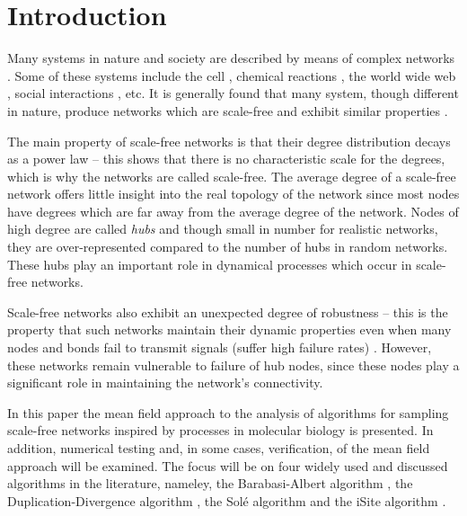 \documentclass[12pt]{iopart}
\begin{document}

\section{Introduction}

Many systems in nature and society are described by means of complex networks  
\cite{BLM06}. Some of these systems include the cell \cite{JTA00}, 
chemical reactions \cite{GA05}, the world wide web \cite{BAJ00}, 
social interactions \cite{BBP04}, etc.  It is generally found that many system,
though different in nature,  produce networks which are scale-free and
exhibit similar properties \cite{AB02,B09}. 

The main property of scale-free networks is that their degree distribution 
decays as a power law \cite{AB02,BA99} -- this shows that there is no
characteristic scale for the degrees, which is why the networks are called scale-free.
The average degree of a scale-free network offers little insight into the 
real topology of the network \cite{B09} since most nodes have degrees which are far 
away from the average degree of the network.  Nodes of high degree are
called \textit{hubs} and though small in number for realistic networks, they are
over-represented compared to the number of hubs in random networks.  These
hubs play an important role in dynamical processes which occur in scale-free networks.

Scale-free networks also exhibit an unexpected degree of robustness --  this is the
property that such networks maintain their dynamic properties even when many 
nodes and bonds fail to transmit signals (suffer high failure rates) \cite{BLM06}.
However, these networks remain vulnerable to failure of hub nodes, since these
nodes play a significant role in maintaining the network's connectivity.

In this paper the mean field approach to the analysis of algorithms for sampling
scale-free networks inspired by processes in molecular biology is presented.
In addition, numerical testing and, in some cases, verification, of the mean field
approach will be examined.  The focus will be on four widely used and discussed
algorithms in the literature, nameley, the Barabasi-Albert algorithm \cite{BA99,BAJ99}, 
the Duplication-Divergence algorithm \cite{TR04,VF02}, 
the Sol\'e algorithm \cite{SPSK02} and the iSite algorithm \cite{G11,GG15}. 
\end{document}
